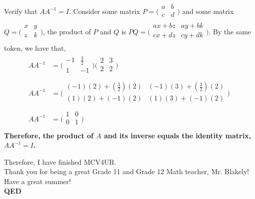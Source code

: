 \documentclass[12pt]{book}
\begin{document}
\begin{enumerate}
Verify that $AA^{-1} = I$. Consider some matrix $P = \bigg(\begin{smallmatrix} a & b \\ c & d \\ \end{smallmatrix}\bigg)$ and some matrix $Q = \bigg(\begin{smallmatrix} x & y \\ z & k \\ \end{smallmatrix}\bigg)$, the product of $P$ and $Q$ is $PQ = \bigg(\begin{smallmatrix} ax+bz & ay+bk \\ cx+dz & cy+dk \\ \end{smallmatrix}\bigg)$. By the same token, we have that,
\begingroup
\addtolength{\jot}{0.5em}
\begin{align}
    AA^{-1} &= \bigg(\begin{smallmatrix} -1 & \frac{3}{2} \\ 1 & -1 \\ \end{smallmatrix}\bigg) \bigg(\begin{smallmatrix} 2 & 3 \\ 2 & 2 \\ \end{smallmatrix}\bigg) \\
    AA^{-1} &= \bigg(\begin{smallmatrix} (-1)(2)+\left(\frac{3}{2}\right)(2) & (-1)(3)+\left(\frac{3}{2}\right)(2) \\ (1)(2)+(-1)(2) & (1)(3)+(-1)(2) \\ \end{smallmatrix}\bigg) \\
    AA^{-1} &= \bigg(\begin{smallmatrix} 1 & 0 \\ 0 & 1 \\ \end{smallmatrix}\bigg)
\end{align}
\endgroup
\textbf{Therefore, the product of $A$ and its inverse equals the identity matrix, $AA^{-1} = I$.}

\newpage

\begin{center}
    
    \centering\large{Therefore, I have finished MCV4UR.}\\
    
    Thank you for being a great Grade 11 and Grade 12 Math teacher, Mr. Blakely!\\
    Have a great summer!\\
    \textbf{QED}\\
\end{center}


\end{enumerate}
\end{document}
